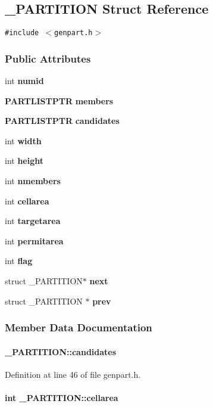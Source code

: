 \subsection{\_\-PARTITION  Struct Reference}
\label{_PARTITION}
{\tt \#include $<$genpart.h$>$}

\subsubsection*{Public Attributes}
\begin{CompactItemize}
\item 
int {\bf numid}
\item 
{\bf PARTLISTPTR} {\bf members}
\item 
{\bf PARTLISTPTR} {\bf candidates}
\item 
int {\bf width}
\item 
int {\bf height}
\item 
int {\bf nmembers}
\item 
int {\bf cellarea}
\item 
int {\bf targetarea}
\item 
int {\bf permitarea}
\item 
int {\bf flag}
\item 
struct \_\-PARTITION$\ast$ {\bf next}
\item 
struct \_\-PARTITION $\ast$ {\bf prev}
\end{CompactItemize}


\subsubsection{Member Data Documentation}
\label{_PARTITION_m2}
\paragraph{ \_\-PARTITION::candidates}\hfill



Definition at line 46 of file genpart.h.\label{_PARTITION_m6}
\paragraph{\setlength{\rightskip}{0pt plus 5cm}int \_\-PARTITION::cellarea}\hfill



